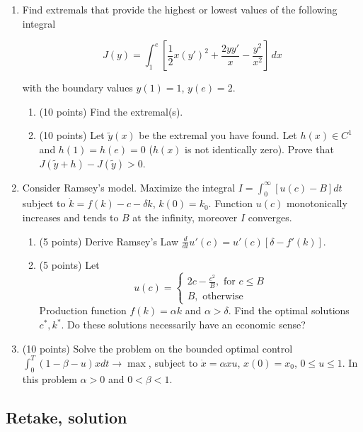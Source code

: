 \documentclass[12pt, a4paper]{article}
\begin{document}
\begin{enumerate}[resume]

\item	Find extremals that provide the highest or lowest values of the following integral

\[
J(y)=\int _1^{e} \left[ \frac{1}{2} x(y')^{2} +\frac{2yy'}{x} -\frac{y^{2} }{x^{2} } \right] \, dx
\]

with the boundary values $y(1)=1$, $y(e)=2$.

\begin{enumerate}
\item (10 points) Find the extremal(s).

\item (10 points) Let $\tilde{y}(x)$ be the extremal you have found. Let  $h(x)\in C^{1} $ and $h(1)=h(e)=0$ ($h(x)$ is not identically zero). Prove that $J(\tilde{y}+h)-J(\tilde{y})>0$.
\end{enumerate}

\item Consider Ramsey's model. Maximize the integral $I=\int _0^{\infty }[u(c)-B]dt $ subject to $\dot{k}=f(k)-c-\delta k$, $k(0)=k_{0}$. Function $u(c)$ monotonically increases and tends to $B$ at the infinity, moreover $I$ converges.

\begin{enumerate}
\item (5 points) Derive Ramsey's Law $\frac{d}{dt} u'(c)=u'(c)[\delta -f'(k)]$.

\item (5 points) Let
\[
u(c) =
\begin{cases}
2c - \frac{c^2}{B}, \text{ for } c \leq B \\
B, \text{ otherwise }
\end{cases}
\]
Production function $f(k)=\alpha k$ and $\alpha >\delta $. Find the optimal solutions $c^*,k^*$. Do these solutions necessarily have an economic sense?
\end{enumerate}



\item (10 points) Solve the problem on the bounded optimal control $\int _0^{T}(1-\beta -u)xdt \to \max$, subject to $\dot{x}=\alpha xu$, $x(0)=x_{0}$, $0\le u\le 1$. In this problem $\alpha>0$ and $0<\beta <1$.

\end{enumerate}

\subsection{Retake, solution}
\end{document}
